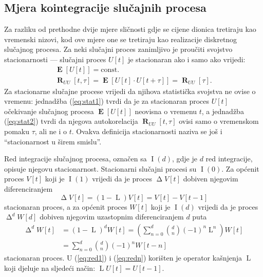 \documentclass[lmodern, utf8, diplomski, numeric]{fer}
\newcommand{\E}[1]{\operatorname{\mathbf{E}}\q[#1\w]}
\newcommand{\R}[2]{\operatorname{\mathbf{R}}_{#1}\q[#2\w]}
\newcommand{\I}[1]{\operatorname{\mathrm{I}}\q(#1\w)}
\newcommand{\diff}{\operatorname{\mathrm{\Delta}}}
\newcommand{\diffn}[1]{\operatorname{\mathrm{\Delta}}^d}
\newcommand{\lag}{\operatorname{\mathrm{L}}}
\newcommand{\q}{\left}
\newcommand{\w}{\right}
\begin{document}
  \subsection{Mjera kointegracije slučajnih procesa}
  Za razliku od prethodne dvije mjere sličnosti gdje se cijene dionica tretiraju kao vremenski nizovi, kod ove mjere one se tretiraju kao realizacije diskretnog slučajnog procesa.
  Za neki slučajni proces zanimljivo je proučiti svojstvo stacionarnosti --- slučajni proces $U\q[t\w]$ je stacionaran ako i samo ako vrijedi:
  \begin{gather}
  \label{eq:stat1}
  \E{U\q[t\w]} = \mathrm{const.}\\
  \label{eq:stat2}
  \R{UU}{t, \tau} = \E{U\q[t\w] \cdot U\q[t + \tau\w]} = \R{UU}{\tau}.
  \end{gather}
  Za stacionarne slučajne procese vrijedi da njihova statistička svojstva ne ovise o vremenu:
  jednadžba (\ref{eq:stat1}) tvrdi da je za stacionaran proces $U\q[t\w]$ očekivanje slučajnog procesa $\E{U\q[t\w]}$ neovisna o vremenu $t$, a jednadžba (\ref{eq:stat2}) tvrdi da njegova autokorelacija $\R{UU}{t, \tau}$ ovisi samo o vremenskom pomaku $\tau$, ali ne i o $t$.
  Ovakva definicija stacionarnosti naziva se još i ``stacionarnost u širem smislu''.
  
  Red integracije slučajnog procesa, označen sa $\I{d}$, gdje je $d$ red integracije, opisuje njegovu stacionarnost.
  Stacionarni slučajni procesi su $\I{0}$.
  Za općenit proces $V\q[t\w]$ koji je $\I{1}$ vrijedi da je proces $\diff V\q[t\w]$ dobiven njegovim diferenciranjem
  \begin{equation}
  \label{eq:red1}
  \diff V\q[t\w] = \q(1 - \lag\w) V\q[t\w] = V\q[t\w] - V\q[t - 1\w]
  \end{equation}
  stacionaran proces, a za općenit proces $W\q[t\w]$ koji je $\I{d}$ vrijedi da je proces $\diffn{d} W\q[d\w]$ dobiven njegovim uzastopnim diferenciranjem $d$ puta
  \begin{align}
  \diffn{d} W\q[t\w] &= \q(1 - \lag\w)^d W\q[t\w] = \q( \sum_{n = 0}^{d} \binom{d}{n} \q(-1\w)^n\lag^n \w) W\q[t\w] \nonumber \\
  \label{eq:redn}
  &= \sum_{n = 0}^{d} \binom{d}{n} \q(-1\w)^n W\q[t - n\w]
  \end{align}
  stacionaran proces.
  U (\ref{eq:red1}) i (\ref{eq:redn}) korišten je operator kašnjenja $\lag$ koji djeluje na sljedeći način: $\lag U\q[t\w] = U\q[t - 1\w]$.
  
\end{document}
